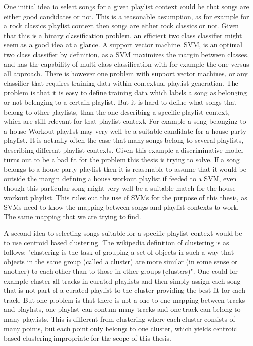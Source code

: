 \documentclass[a4paper,11pt]{kth-mag}
\begin{document}
One initial idea to select songs for a given playlist context could be that songs are either good candidates or not. This is a reasonable assumption, as for example for a rock classics playlist context then songs are either rock classics or not. Given that this is a binary classification problem, an efficient two class classifier might seem as a good idea at a glance. A support vector machine, SVM,  is an optimal two class classifier by definition, as a SVM maximizes the margin between classes\cite{cortes1995support}, and has the capability of multi class classification with for example the one versus all approach\cite{hsu2002comparison}. There is however one problem with support vector machines, or any classifier that requires training data within contextual playlist generation. The problem is that it is easy to define training data which labels a song as belonging or not belonging to a certain playlist. But it is hard to define what songs that belong to other playlists, than the one describing a specific playlist context, which are still relevant for that playlist context. For example a song belonging to a house Workout playlist may very well be a suitable candidate for a house party playlist. It is actually often the case that many songs belong to several playlists, describing different playlist contexts. Given this example a discriminative model turns out to be a bad fit for the problem this thesis is trying to solve. If a song belongs to a house party playlist then it is reasonable to assume that it would be outside the margin defining a house workout playlist if feeded to a SVM, even though this particular song might very well be a suitable match for the house workout playlist. This rules out the use of SVMs for the purpose of this thesis, as SVMs need to know the mapping between songs and playlist contexts to work. The same mapping that we are trying to find.

A second idea to selecting songs suitable for a specific playlist context would be to use centroid based clustering. The wikipedia definition of clustering is as follows: "clustering is the task of grouping a set of objects in such a way that objects in the same group (called a cluster) are more similar (in some sense or another) to each other than to those in other groups (clusters)". One could for example cluster all tracks in curated playlists and then simply assign each song that is not part of a curated playlist to the cluster providing the best fit for each track. But one problem is that there is not a one to one mapping between tracks and playlists, one playlist can contain many tracks and one track can belong to many playlists. This is different from clustering where each cluster consists of many points, but each point only belongs to one cluster, which yields centroid based clustering impropriate for the scope of this thesis. 
\end{document}
